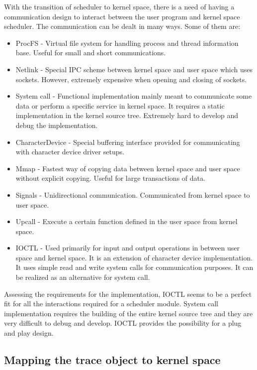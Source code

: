With the transition of scheduler to kernel space, there is a need of having a communication design to interact between the user program and kernel space scheduler. 
The communication can be dealt in many ways\cite{commkernelanduser}. 
Some of them are:

\begin{itemize}
\item ProcFS - Virtual file system for handling process and thread information base. Useful for small and short communications. 
\item Netlink - Special IPC scheme between kernel space and user space which uses sockets. However, extremely expensive when opening and closing of sockets.
\item System call - Functional implementation mainly meant to communicate some data or perform a specific service in kernel space. It requires a static implementation in the kernel source tree. Extremely hard to develop and debug the implementation.
\item CharacterDevice - Special buffering interface provided for communicating with character device driver setups.
\item Mmap - Fastest way of copying data between kernel space and user space without explicit copying. Useful for large transactions of data.
\item Signals - Unidirectional communication. Communicated from kernel space to user space. 
\item Upcall - Execute a certain function defined in the user space from kernel space.
\item IOCTL - Used primarily for input and output operations in between user space and kernel space. It is an extension of character device implementation. It uses simple read and write system calls for communication purposes. It can be realized as an alternative for system call.

\end{itemize}


Assessing the requirements for the implementation, IOCTL seems to be a perfect fit for all the interactions required for a scheduler module. 
System call implementation requires the building of the entire kernel source tree and they are very difficult to debug and develop. 
IOCTL provides the possibility for a plug and play design.

\subsection{Mapping the trace object to kernel space}

